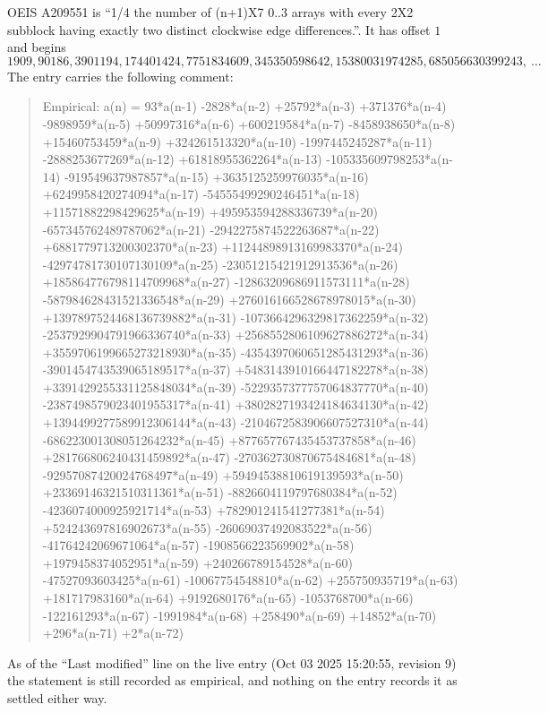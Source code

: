 \documentclass[11pt,a4paper]{article}
\theoremstyle{plain}
\theoremstyle{definition}
\begin{document}
OEIS A209551 is ``1/4 the number of (n+1)X7 0..3 arrays with every 2X2 subblock having exactly two distinct clockwise edge differences.''. It has offset $1$ and begins
\[
1909, 90186, 3901194, 174401424, 7751834609, 345350598642, 15380031974285, 685056630399243,\ \dots
\]
The entry carries the following comment:
\begin{quote}\small
Empirical: a(n) = 93*a(n-1) -2828*a(n-2) +25792*a(n-3) +371376*a(n-4) -9898959*a(n-5) +50997316*a(n-6) +600219584*a(n-7) -8458938650*a(n-8) +15460753459*a(n-9) +324261513320*a(n-10) -1997445245287*a(n-11) -2888253677269*a(n-12) +61818955362264*a(n-13) -105335609798253*a(n-14) -919549637987857*a(n-15) +3635125259976035*a(n-16) +6249958420274094*a(n-17) -54555499290246451*a(n-18) +11571882298429625*a(n-19) +495953594288336739*a(n-20) -657345762489787062*a(n-21) -2942275874522263687*a(n-22) +6881779713200302370*a(n-23) +11244898913169983370*a(n-24) -42974781730107130109*a(n-25) -23051215421912913536*a(n-26) +185864776798114709968*a(n-27) -12863209686911573111*a(n-28) -587984628431521336548*a(n-29) +276016166528678978015*a(n-30) +1397897524468136739882*a(n-31) -1073664296329817362259*a(n-32) -2537929904791966336740*a(n-33) +2568552806109627886272*a(n-34) +3559706199665273218930*a(n-35) -4354397060651285431293*a(n-36) -3901454743539065189517*a(n-37) +5483143910166447182278*a(n-38) +3391429255331125848034*a(n-39) -5229357377757064837770*a(n-40) -2387498579023401955317*a(n-41) +3802827193424184634130*a(n-42) +1394499277589912306144*a(n-43) -2104672583906607527310*a(n-44) -686223001308051264232*a(n-45) +877657767435453737858*a(n-46) +281766806240431459892*a(n-47) -270362730870675484681*a(n-48) -92957087420024768497*a(n-49) +59494538810619139593*a(n-50) +23369146321510311361*a(n-51) -8826604119797680384*a(n-52) -4236074000925921714*a(n-53) +782901241541277381*a(n-54) +524243697816902673*a(n-55) -26069037492083522*a(n-56) -41764242069671064*a(n-57) -1908566223569902*a(n-58) +1979458374052951*a(n-59) +240266789154528*a(n-60) -47527093603425*a(n-61) -10067754548810*a(n-62) +255750935719*a(n-63) +181717983160*a(n-64) +9192680176*a(n-65) -1053768700*a(n-66) -122161293*a(n-67) -1991984*a(n-68) +258490*a(n-69) +14852*a(n-70) +296*a(n-71) +2*a(n-72)
\end{quote}
As of the ``Last modified'' line on the live entry (Oct 03 2025 15:20:55, revision 9) the statement is
still recorded as empirical, and nothing on the entry records it as settled either way.
\end{document}
